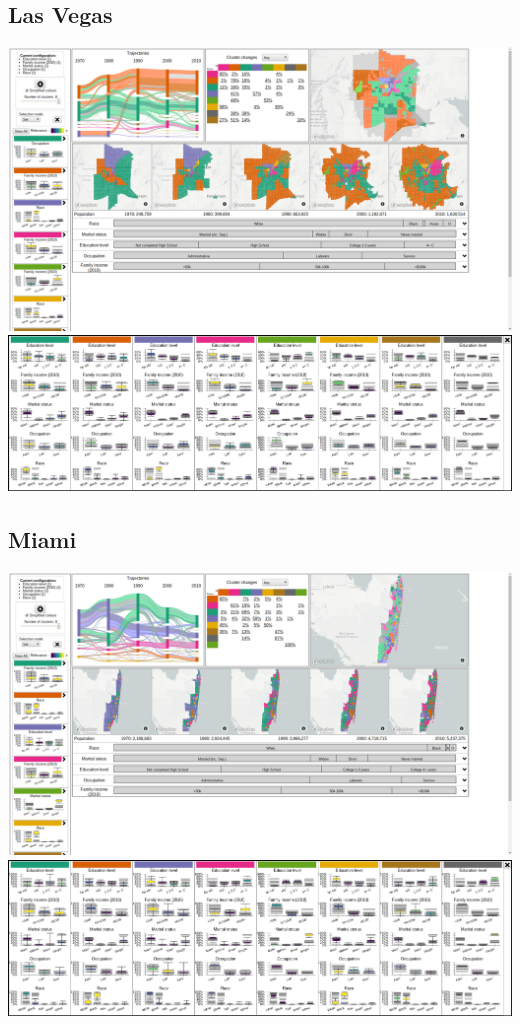 \documentclass[a4paper]{article}
\begin{document}
\subsection{Las Vegas}
\begin{center}
	\includegraphics[width=\linewidth]{29a.png}
	\includegraphics[width=\linewidth]{29b.png}
\end{center} \clearpage



\subsection{Miami}
\begin{center}
	\includegraphics[width=\linewidth]{30a.png}
	\includegraphics[width=\linewidth]{30b.png}
\end{center} \clearpage
\end{document}
